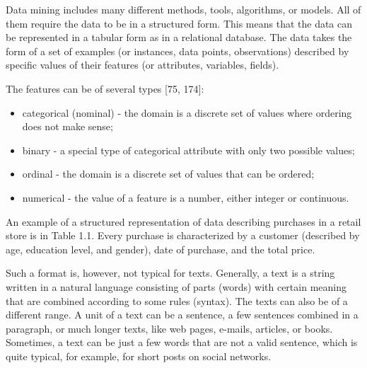 \documentclass[11pt,openany,executivepaper]{book}
\begin{document}
Data mining includes many different methods, tools, algorithms, or models. All of them require the data to be in a structured form. This means that the data can be represented in a tabular form as in a relational database. The data takes the form of a set of examples (or instances, data points, observations) described by specific values of their features (or attributes, variables, fields).

The features can be of several types [75, 174]:
\begin{itemize}
  \item categorical (nominal) - the domain is a discrete set of values where ordering does not make sense;
  \item binary - a special type of categorical attribute with only two possible values;
  \item ordinal - the domain is a discrete set of values that can be ordered;
  \item numerical - the value of a feature is a number, either integer or continuous.
\end{itemize}
An example of a structured representation of data describing purchases in a retail store is in Table 1.1. Every purchase is characterized by a customer (described by age, education level, and gender), date of purchase, and the total price.

Such a format is, however, not typical for texts. Generally, a text is a string written in a natural language consisting of parts (words) with certain meaning that are combined according to some rules (syntax). The texts can also be of a different range. A unit of a text can be a sentence, a few sentences combined in a paragraph, or much longer texts, like web pages, e-mails, articles, or books. Sometimes, a text can be just a few words that are not a valid sentence, which is quite typical, for example, for short posts on social networks.
\end{document}
